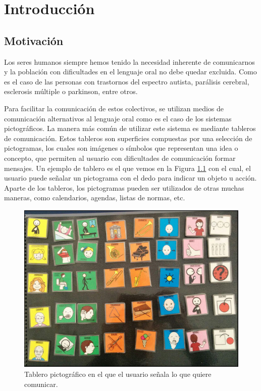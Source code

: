 \chapter{Introducción}
\label{cap:introduccion}



\section{Motivación}
\label{cap1:sec:Motivacion}

Los seres humanos siempre hemos tenido la necesidad inherente de comunicarnos y la población con dificultades en el lenguaje oral no debe quedar excluida. Como es el caso de las personas con trastornos del espectro autista, parálisis cerebral, esclerosis múltiple o parkinson, entre otros. 

Para facilitar la comunicación de estos colectivos, se utilizan medios de comunicación
alternativos al lenguaje oral como es el caso de los sistemas pictográficos.
La  manera más común de utilizar este sistema es mediante tableros de comunicación. Estos tableros son superficies  compuestas por una selección de pictogramas, los cuales son imágenes o símbolos que representan una idea o concepto, que permiten al usuario con dificultades de comunicación formar mensajes. Un ejemplo de tablero es el que vemos en la Figura  \ref{fig:tablerofisico}  con el cual, el usuario puede señalar un pictograma con el dedo para indicar un objeto u acción. Aparte de los tableros, los pictogramas pueden ser utilizados de otras muchas maneras, como calendarios, agendas, listas de normas, etc.



\begin{figure}[h!]
	\centering
	\includegraphics[width=0.7\linewidth]{Imagenes/Bitmap/tablerofisico}
	\caption{Tablero pictográfico en el que el usuario señala lo que quiere comunicar.}
	\label{fig:tablerofisico}
\end{figure}


